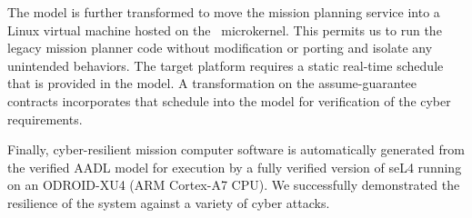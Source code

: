 The model is further transformed to move the mission planning service into a 
Linux virtual machine hosted on the \selFour \ microkernel. This permits us to run the
legacy mission planner code without modification or porting and isolate any 
unintended behaviors.  
The target platform requires a static real-time schedule that is provided in the model.
A transformation on the assume-guarantee contracts incorporates that schedule into the model
for verification of the cyber requirements.

Finally, cyber-resilient mission computer software is automatically generated from the verified 
AADL model for execution by a fully verified version of seL4 running on an ODROID-XU4 (ARM Cortex-A7 CPU).  
We successfully demonstrated the resilience of the system against a variety of cyber attacks. 

%
